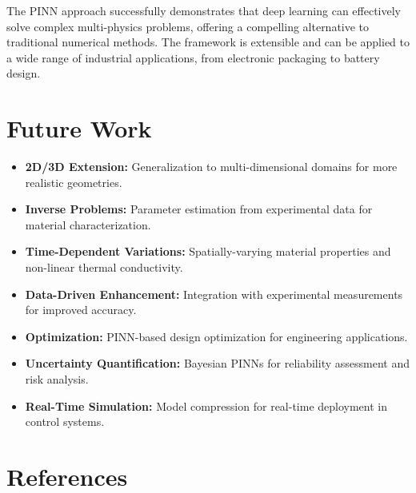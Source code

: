 \documentclass[11pt,a4paper]{article}
\begin{document}
The PINN approach successfully demonstrates that deep learning can effectively solve complex multi-physics problems, offering a compelling alternative to traditional numerical methods. The framework is extensible and can be applied to a wide range of industrial applications, from electronic packaging to battery design.

\section{Future Work}

\begin{itemize}
    \item \textbf{2D/3D Extension:} Generalization to multi-dimensional domains for more realistic geometries.
    \item \textbf{Inverse Problems:} Parameter estimation from experimental data for material characterization.
    \item \textbf{Time-Dependent Variations:} Spatially-varying material properties and non-linear thermal conductivity.
    \item \textbf{Data-Driven Enhancement:} Integration with experimental measurements for improved accuracy.
    \item \textbf{Optimization:} PINN-based design optimization for engineering applications.
    \item \textbf{Uncertainty Quantification:} Bayesian PINNs for reliability assessment and risk analysis.
    \item \textbf{Real-Time Simulation:} Model compression for real-time deployment in control systems.
\end{itemize}

\section{References}
\end{document}

